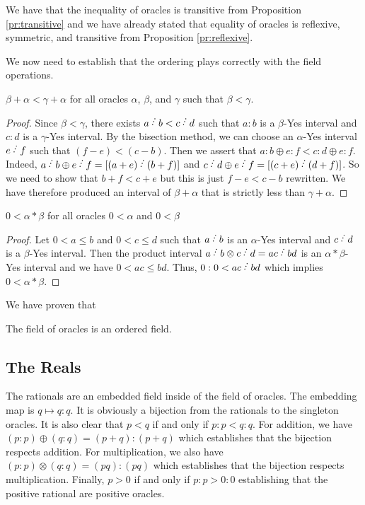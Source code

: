 \documentclass[12pt]{article}
\begin{document}
We have that the inequality of oracles is transitive from Proposition \ref{pr:transitive} and we have already stated that equality of oracles is reflexive, symmetric, and transitive from Proposition \ref{pr:reflexive}. 

We now need to establish that the ordering plays correctly with the field operations. 

\begin{proposition}\label{pr:addinq}
 $\beta + \alpha< \gamma + \alpha$ for all oracles $\alpha$, $\beta$, and $\gamma$ such that $\beta < \gamma$.
\end{proposition}

\begin{proof}
Since $\beta < \gamma$, there exists $a\lte b< c\lte d$ such that $a:b$ is a $\beta$-Yes interval and $c:d$ is a $\gamma$-Yes interval. By the bisection method, we can choose an $\alpha$-Yes interval $e\lte f$ such that $ (f-e) <  (c-b)$. Then we assert that $a:b \oplus e:f  < c:d \oplus e:f$. Indeed, $a \lte b \oplus e \lte f = [(a+e) \lte (b+f)]$ and $c \lte d \oplus e \lte f = [(c+e)\lte (d+f)]$. So we need to show that $b+f < c+e$ but this is just $f-e < c-b$ rewritten. We have therefore produced an interval of $\beta+\alpha$ that is strictly less than $\gamma+\alpha$. 
\end{proof}


\begin{proposition}
$0 < \alpha*\beta$ for all oracles $0 < \alpha$ and $0< \beta$ 
\end{proposition}

\begin{proof}
Let $0 < a \leq b$ and $0<c \leq d$ such that $a\lte b$ is an $\alpha$-Yes interval and $c\lte d$ is a $\beta$-Yes interval. Then the product interval $a \lte b \otimes c \lte d = ac \lte bd$ is an $\alpha*\beta$-Yes interval and we have $0 < ac \leq bd$. Thus, $0:0 < ac \lte bd$ which implies $0 < \alpha*\beta$. 
\end{proof}

We have proven that

\begin{theorem}
The field of oracles is an ordered field.
\end{theorem}

\subsection{The Reals}

The rationals are an embedded field inside of the field of oracles. The embedding map is $q \mapsto q:q$. It is obviously a bijection from the rationals to the singleton oracles. It is also clear that $p<q$ if and only if $p:p < q:q$. For addition, we have $(p:p) \oplus (q:q) = (p+q):(p+q)$ which establishes that the bijection respects addition. For multiplication, we also have $(p:p) \otimes (q:q) = (pq):(pq)$ which establishes that the bijection respects multiplication.  Finally, $p>0$ if and only if $p:p > 0:0$ establishing that the positive rational are positive oracles. 
\end{document}
